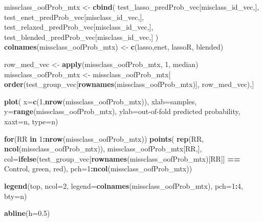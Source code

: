 \documentclass[
]{book}
\newenvironment{Shaded}{\begin{snugshade}}{\end{snugshade}}
\newcommand{\ControlFlowTok}[1]{\textcolor[rgb]{0.13,0.29,0.53}{\textbf{#1}}}
\newcommand{\DataTypeTok}[1]{\textcolor[rgb]{0.13,0.29,0.53}{#1}}
\newcommand{\DecValTok}[1]{\textcolor[rgb]{0.00,0.00,0.81}{#1}}
\newcommand{\FloatTok}[1]{\textcolor[rgb]{0.00,0.00,0.81}{#1}}
\newcommand{\KeywordTok}[1]{\textcolor[rgb]{0.13,0.29,0.53}{\textbf{#1}}}
\newcommand{\NormalTok}[1]{#1}
\newcommand{\OperatorTok}[1]{\textcolor[rgb]{0.81,0.36,0.00}{\textbf{#1}}}
\newcommand{\StringTok}[1]{\textcolor[rgb]{0.31,0.60,0.02}{#1}}
\begin{document}
\begin{Shaded}
\begin{Highlighting}[]
\NormalTok{missclass\_oofProb\_mtx <{-}}\StringTok{ }\KeywordTok{cbind}\NormalTok{(}
\NormalTok{ test\_lasso\_predProb\_vec[misclass\_id\_vec,],}
\NormalTok{ test\_enet\_predProb\_vec[misclass\_id\_vec,],}
\NormalTok{ test\_relaxed\_predProb\_vec[misclass\_id\_vec,],}
\NormalTok{ test\_blended\_predProb\_vec[misclass\_id\_vec,]}
\NormalTok{)}
\KeywordTok{colnames}\NormalTok{(missclass\_oofProb\_mtx) <{-}}\StringTok{ }\KeywordTok{c}\NormalTok{(}\StringTok{\textquotesingle{}lasso\textquotesingle{}}\NormalTok{,}\StringTok{\textquotesingle{}enet\textquotesingle{}}\NormalTok{, }\StringTok{\textquotesingle{}lassoR\textquotesingle{}}\NormalTok{, }\StringTok{\textquotesingle{}blended\textquotesingle{}}\NormalTok{)}

\NormalTok{row\_med\_vec <{-}}\StringTok{ }\KeywordTok{apply}\NormalTok{(missclass\_oofProb\_mtx, }\DecValTok{1}\NormalTok{, median)}
\NormalTok{missclass\_oofProb\_mtx <{-}}\StringTok{ }\NormalTok{missclass\_oofProb\_mtx[}
  \KeywordTok{order}\NormalTok{(test\_group\_vec[}\KeywordTok{rownames}\NormalTok{(missclass\_oofProb\_mtx)], row\_med\_vec),]}

\KeywordTok{plot}\NormalTok{(}
 \DataTypeTok{x=}\KeywordTok{c}\NormalTok{(}\DecValTok{1}\NormalTok{,}\KeywordTok{nrow}\NormalTok{(missclass\_oofProb\_mtx)), }\DataTypeTok{xlab=}\StringTok{\textquotesingle{}samples\textquotesingle{}}\NormalTok{,}
 \DataTypeTok{y=}\KeywordTok{range}\NormalTok{(missclass\_oofProb\_mtx), }\DataTypeTok{ylab=}\StringTok{\textquotesingle{}out{-}of{-}fold predicted probability\textquotesingle{}}\NormalTok{,}
 \DataTypeTok{xaxt=}\StringTok{\textquotesingle{}n\textquotesingle{}}\NormalTok{, }\DataTypeTok{type=}\StringTok{\textquotesingle{}n\textquotesingle{}}\NormalTok{)}

\ControlFlowTok{for}\NormalTok{(RR }\ControlFlowTok{in} \DecValTok{1}\OperatorTok{:}\KeywordTok{nrow}\NormalTok{(missclass\_oofProb\_mtx))}
\KeywordTok{points}\NormalTok{(}
 \KeywordTok{rep}\NormalTok{(RR, }\KeywordTok{ncol}\NormalTok{(missclass\_oofProb\_mtx)), }
\NormalTok{ missclass\_oofProb\_mtx[RR,],}
 \DataTypeTok{col=}\KeywordTok{ifelse}\NormalTok{(test\_group\_vec[}\KeywordTok{rownames}\NormalTok{(missclass\_oofProb\_mtx)[RR]] }\OperatorTok{==}\StringTok{ \textquotesingle{}Control\textquotesingle{}}\NormalTok{,}
  \StringTok{\textquotesingle{}green\textquotesingle{}}\NormalTok{, }\StringTok{\textquotesingle{}red\textquotesingle{}}\NormalTok{),}
 \DataTypeTok{pch=}\DecValTok{1}\OperatorTok{:}\KeywordTok{ncol}\NormalTok{(missclass\_oofProb\_mtx))}

\KeywordTok{legend}\NormalTok{(}\StringTok{\textquotesingle{}top\textquotesingle{}}\NormalTok{, }\DataTypeTok{ncol=}\DecValTok{2}\NormalTok{, }\DataTypeTok{legend=}\KeywordTok{colnames}\NormalTok{(missclass\_oofProb\_mtx), }
 \DataTypeTok{pch=}\DecValTok{1}\OperatorTok{:}\DecValTok{4}\NormalTok{, }\DataTypeTok{bty=}\StringTok{\textquotesingle{}n\textquotesingle{}}\NormalTok{)}

\KeywordTok{abline}\NormalTok{(}\DataTypeTok{h=}\FloatTok{0.5}\NormalTok{)}
\end{Highlighting}
\end{Shaded}
\end{document}
